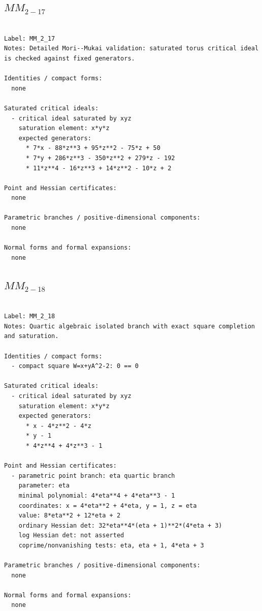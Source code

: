\documentclass[10pt,a4paper]{article}
\begin{document}
\subsection*{$ MM_{2-17} $}

\begin{lstlisting}

Label: MM_2_17
Notes: Detailed Mori--Mukai validation: saturated torus critical ideal is checked against fixed generators.

Identities / compact forms:
  none

Saturated critical ideals:
  - critical ideal saturated by xyz
    saturation element: x*y*z
    expected generators:
      * 7*x - 88*z**3 + 95*z**2 - 75*z + 50
      * 7*y + 286*z**3 - 350*z**2 + 279*z - 192
      * 11*z**4 - 16*z**3 + 14*z**2 - 10*z + 2

Point and Hessian certificates:
  none

Parametric branches / positive-dimensional components:
  none

Normal forms and formal expansions:
  none

\end{lstlisting}

\subsection*{$ MM_{2-18} $}

\begin{lstlisting}

Label: MM_2_18
Notes: Quartic algebraic isolated branch with exact square completion and saturation.

Identities / compact forms:
  - compact square W=x+yA^2-2: 0 == 0

Saturated critical ideals:
  - critical ideal saturated by xyz
    saturation element: x*y*z
    expected generators:
      * x - 4*z**2 - 4*z
      * y - 1
      * 4*z**4 + 4*z**3 - 1

Point and Hessian certificates:
  - parametric point branch: eta quartic branch
    parameter: eta
    minimal polynomial: 4*eta**4 + 4*eta**3 - 1
    coordinates: x = 4*eta**2 + 4*eta, y = 1, z = eta
    value: 8*eta**2 + 12*eta + 2
    ordinary Hessian det: 32*eta**4*(eta + 1)**2*(4*eta + 3)
    log Hessian det: not asserted
    coprime/nonvanishing tests: eta, eta + 1, 4*eta + 3

Parametric branches / positive-dimensional components:
  none

Normal forms and formal expansions:
  none

\end{lstlisting}
\end{document}
